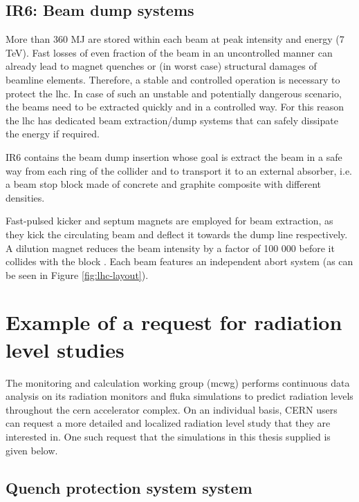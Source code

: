 \documentclass[encoding=utf8,british]{tumphthesis}
\begin{document}
\section{IR6: Beam dump systems}
\label{ssec:ir6-beam-dump-systems}

More than 360 MJ are stored within each beam at peak intensity and energy (7 TeV). Fast losses of even fraction of the beam in an uncontrolled manner can already lead to magnet quenches or (in worst case) structural damages of beamline elements. Therefore, a stable and controlled operation is necessary to protect the \acrshort{lhc}. In case of such an unstable and potentially dangerous scenario, the beams need to be extracted quickly and in a controlled way. For this reason the \acrshort{lhc} has dedicated beam extraction/dump systems that can safely dissipate the energy if required.

IR6  \cite{Verdier:691998} contains the beam dump insertion whose goal is extract the beam in a safe way from each ring of the collider and to transport it to an external absorber, i.e. a beam stop block made of concrete and graphite composite with different densities. 

Fast-pulsed kicker and septum magnets are employed for beam extraction, as they kick the circulating beam and deflect it towards the dump line respectively. A dilution magnet reduces the beam intensity by a factor of 100 000 before it collides with the block \cite{Bruno:691838}. Each beam features an independent abort system (as can be seen in Figure \ref{fig:lhc-layout}).




\chapter{Example of a request for radiation level studies}
\label{chapter:MCWG-requests}

The monitoring and calculation working group (\acrshort{mcwg}) performs continuous data analysis on its radiation monitors and \acrshort{fluka} simulations to predict radiation levels throughout the \acrshort{cern} accelerator complex. On an individual basis, CERN users can request a more detailed and localized radiation level study that they are interested in. One such request that the simulations in this thesis supplied is given below.

\section{Quench protection system system}
\label{section:QPS-system}
\end{document}
